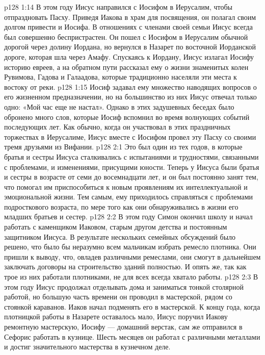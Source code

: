 \vs p128 1:14 \pc В этом году Иисус направился с Иосифом в Иерусалим, чтобы отпраздновать Пасху. Приведя Иакова в храм для посвящения, он полагал своим долгом привести и Иосифа. В отношениях с членами своей семьи Иисус всегда был совершенно беспристрастен. Он пошел с Иосифом в Иерусалим обычной дорогой через долину Иордана, но вернулся в Назарет по восточной Иорданской дороге, которая шла через Амафу. Спускаясь к Иордану, Иисус излагал Иосифу историю евреев, а на обратном пути рассказал ему о жизни знаменитых колен Рувимова, Гадова и Галаадова, которые традиционно населяли эти места к востоку от реки.
\vs p128 1:15 Иосиф задавал ему множество наводящих вопросов о его жизненном предназначении, но на большинство из них Иисус отвечал только одно: «Мой час еще не настал». Однако в этих задушевных беседах было обронено много слов, которые Иосиф вспомнил во время волнующих событий последующих лет. Как обычно, когда он участвовал в этих праздничных торжествах в Иерусалиме, Иисус вместе с Иосифом провел эту Пасху со своими тремя друзьями из Вифании.
\vs p128 2:1 Это был один из тех годов, в которые братья и сестры Иисуса сталкивались с испытаниями и трудностями, связанными с проблемами, и изменениями, присущими юности. Теперь у Иисуса были братья и сестры в возрасте от семи до восемнадцати лет, и он был постоянно занят тем, что помогал им приспособиться к новым проявлениям их интеллектуальной и эмоциональной жизни. Тем самым, ему приходилось справляться с проблемами подросткового возраста, по мере того как они обнаруживались в жизни его младших братьев и сестер.
\vs p128 2:2 В этом году Симон окончил школу и начал работать с каменщиком Иаковом, старым другом детства и постоянным защитником Иисуса. В результате нескольких семейных обсуждений было решено, что было бы неразумно всем мальчикам избрать ремесло плотника. Они пришли к выводу, что, овладев различными ремеслами, они смогут в дальнейшем заключать договоры на строительство зданий полностью. И опять же, так как трое из них работали плотниками, не для всех всегда хватало работы.
\vs p128 2:3 В этом году Иисус продолжал отделывать дома и заниматься тонкой столярной работой, но большую часть времени он проводил в мастерской, рядом со стоянкой караванов. Иаков начал подменять его в мастерской. К концу года, когда плотницкой работы в Назарете оставалось мало, Иисус поручил Иакову ремонтную мастерскую, Иосифу --- домашний верстак, сам же отправился в Сефорис работать в кузнице. Шесть месяцев он работал с различными металлами и достиг значительного мастерства в кузнечном деле.
